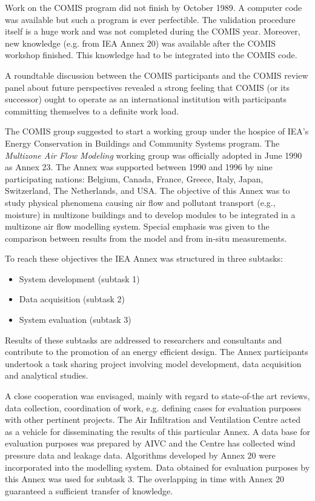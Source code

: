 \documentclass[10pt]{book}
\begin{document}
Work on the COMIS program did not finish by October 1989. A computer code was available but such a program is ever perfectible. The validation procedure itself is a huge work and was not completed during the COMIS year. Moreover, new knowledge (e.g. from IEA Annex 20) was available after the COMIS workshop finished. This knowledge had to be integrated into the COMIS code.

A roundtable discussion between the COMIS participants and the COMIS review panel about future perspectives revealed a strong feeling that COMIS (or its successor) ought to operate as an international institution with participants committing themselves to a definite work load.

The COMIS group suggested to start a working group under the hospice of IEA's Energy Conservation in Buildings and Community Systems program. The \emph{Multizone Air Flow Modeling} working group was officially adopted in June 1990 as Annex 23. The Annex was supported between 1990 and 1996 by nine participating nations: Belgium, Canada, France, Greece, Italy, Japan, Switzerland, The Netherlands, and USA. The objective of this Annex was to study physical phenomena causing air flow and pollutant transport (e.g., moisture) in multizone buildings and to develop modules to be integrated in a multizone air flow modelling system. Special emphasis was given to the comparison between results from the model and from in-situ measurements.

To reach these objectives the IEA Annex was structured in three subtasks:

\begin{itemize}
\item System development (subtask 1)
\item Data acquisition (subtask 2)
\item System evaluation (subtask 3)
\end{itemize}

Results of these subtasks are addressed to researchers and consultants and contribute to the promotion of an energy efficient design. The Annex participants undertook a task sharing project involving model development, data acquisition and analytical studies.

A close cooperation was envisaged, mainly with regard to state-of-the art reviews, data collection, coordination of work, e.g. defining cases for evaluation purposes with other pertinent projects. The Air Infiltration and Ventilation Centre acted as a vehicle for disseminating the results of this particular Annex. A data base for evaluation purposes was prepared by AIVC and the Centre has collected wind pressure data and leakage data. Algorithms developed by Annex 20 were incorporated into the modelling system. Data obtained for evaluation purposes by this Annex was used for subtask 3. The overlapping in time with Annex 20 guaranteed a sufficient transfer of knowledge.
\end{document}
